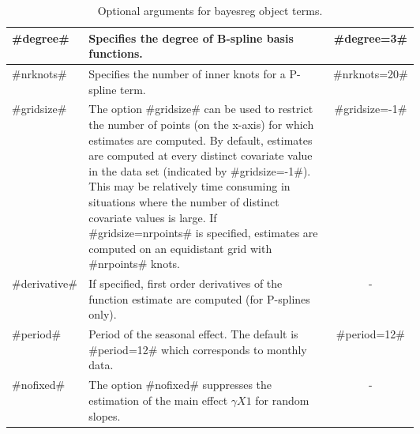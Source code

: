 \begin{table}[ht]
\begin{tabular}{|l|p{0.6\linewidth}|c|}

#degree# & Specifies the degree of B-spline basis functions. &
#degree=3# \\ \hline

#nrknots# & Specifies the number of inner knots for a P-spline
term. & #nrknots=20# \\ \hline

#gridsize# & The option #gridsize# can be used to restrict the
number of points (on the x-axis) for which estimates are computed.
By default, estimates are computed at every distinct covariate
value in the data set (indicated by #gridsize=-1#). This may be
relatively time consuming in situations where the number of
distinct covariate values is large. If #gridsize=nrpoints# is
specified, estimates are computed
on an equidistant grid with #nrpoints# knots. & #gridsize=-1# \\
\hline

#derivative# & If specified, first order derivatives of the
function estimate are computed (for P-splines only). & - \\ \hline

#period# & Period of the seasonal effect. The default is
#period=12# which corresponds to monthly data. & #period=12# \\
\hline

#nofixed# & The option #nofixed# suppresses the estimation of the
main effect $\gamma X1$ for random slopes. & - \\ \hline

\end{tabular}
{\em\caption{\label{options} Optional arguments for bayesreg
object terms.}}
\end{table}


